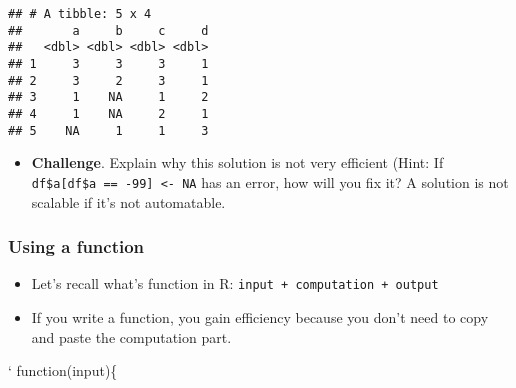 \documentclass[
]{book}
\newenvironment{Shaded}{\begin{snugshade}}{\end{snugshade}}
\newcommand{\CommentTok}[1]{\textcolor[rgb]{0.56,0.35,0.01}{\textit{#1}}}
\newcommand{\DecValTok}[1]{\textcolor[rgb]{0.00,0.00,0.81}{#1}}
\newcommand{\NormalTok}[1]{#1}
\newcommand{\OperatorTok}[1]{\textcolor[rgb]{0.81,0.36,0.00}{\textbf{#1}}}
\newcommand{\OtherTok}[1]{\textcolor[rgb]{0.56,0.35,0.01}{#1}}
\newcommand{\StringTok}[1]{\textcolor[rgb]{0.31,0.60,0.02}{#1}}
\providecommand{\tightlist}{%
  \setlength{\itemsep}{0pt}\setlength{\parskip}{0pt}}
\begin{document}
\begin{Shaded}
\end{Shaded}

\begin{verbatim}
## # A tibble: 5 x 4
##       a     b     c     d
##   <dbl> <dbl> <dbl> <dbl>
## 1     3     3     3     1
## 2     3     2     3     1
## 3     1    NA     1     2
## 4     1    NA     2     1
## 5    NA     1     1     3
\end{verbatim}

\begin{itemize}
\tightlist
\item
  \textbf{Challenge}. Explain why this solution is not very efficient (Hint: If \texttt{df\$a{[}df\$a\ ==\ -99{]}\ \textless{}-\ NA} has an error, how will you fix it? A solution is not scalable if it's not automatable.
\end{itemize}

\hypertarget{using-a-function}{%
\subsubsection{Using a function}\label{using-a-function}}

\begin{itemize}
\item
  Let's recall what's function in R: \texttt{input\ +\ computation\ +\ output}
\item
  If you write a function, you gain efficiency because you don't need to copy and paste the computation part.
\end{itemize}

`
function(input)\{
\end{document}

